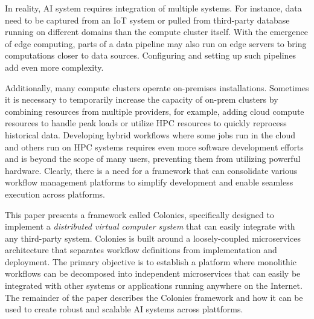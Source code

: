 \documentclass{article}
\begin{document}
In reality, AI system requires integration of multiple systems. For instance, data need to be captured from an IoT system or pulled from third-party database running on different domains than the compute cluster itself. With the emergence of edge computing, parts of a data pipeline may also run on edge servers to bring computations closer to data sources. Configuring and setting up such pipelines add even more complexity. 

Additionally, many compute clusters operate on-premises installations. Sometimes it is necessary to temporarily increase the capacity of on-prem clusters by combining resources from multiple providers, for example, adding cloud compute resources to handle peak loads or utilize HPC resources to quickly reprocess historical data. Developing hybrid workflows where some jobs run in the cloud and others run on HPC systems requires even more software development efforts \cite{wf_challenges} and is beyond the scope of many users, preventing them from utilizing powerful hardware. Clearly, there is a need for a framework that can consolidate various workflow management platforms to simplify development and enable seamless execution across platforms.

This paper presents a framework called Colonies, specifically designed to implement a \emph{distributed virtual computer system} that can easily integrate with any third-party system. Colonies is built around a loosely-coupled microservices architecture that separates workflow definitions from implementation and deployment. The primary objective is to establish a platform where monolithic workflows can be decomposed into independent microservices that can easily be integrated with other systems or applications running anywhere on the Internet. The remainder of the paper describes the Colonies framework and how it can be used to create robust and scalable AI systems across plattforms. 
\end{document}
